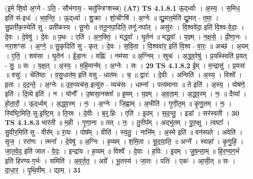 \documentclass[17pt]{extarticle}
\begin{document}
                  \newline
                      (इ॒मे शि॒वो अ॒ग्ने - ऽति॒ - सौभ॑गाय॒ - चतु॑स्त्रिꣳशच्च)  \textbf{(A7)} \newline \newline
                                \textbf{ TS 4.1.8.1} \newline
                  ऊ॒द्‌र्ध्वाः । अ॒स्य॒ । स॒मिध॒ इति॑ सं-इधः॑ । भ॒व॒न्ति॒ । ऊ॒द्‌र्ध्वा । शु॒क्रा । शो॒चीꣳषि॑ । अ॒ग्नेः ॥ द्यु॒मत्त॒मेति॑ द्यु॒मत् - त॒मा॒ । सु॒प्रती॑क॒स्येति॑ सु - प्रती॑कस्य । सू॒नोः ॥ तनू॒नपा॒दिति॒ तनू᳚-नपा᳚त् । असु॑रः । वि॒श्ववे॑दा॒ इति॑ वि॒श्व-वे॒दाः॒ । दे॒वः । दे॒वेषु॑ । दे॒वः ॥ प॒थः । एति॑ । अ॒न॒क्ति॒ । मद्ध्वा᳚ । घृ॒तेन॑ ॥ मद्ध्वा᳚ । य॒ज्ञ्म् । न॒क्ष॒से॒ । प्री॒णा॒नः । नरा॒शꣳसः॑ । अ॒ग्ने॒ ॥ सु॒कृदिति॑ सु - कृत् । दे॒वः । स॒वि॒ता । वि॒श्ववा॑र॒ इति॑ वि॒श्व - वा॒रः॒ ॥ अच्छ॑ । अ॒यम् । ए॒ति॒ । शव॑सा । घृ॒तेन॑ । ई॒डा॒नः । वह्निः॑ । नम॑सा ॥ अ॒ग्निम् । स्रुचः॑ । अ॒द्ध्व॒रेषु॑ । प्र॒यथ्स्विति॑ प्र॒यत् - सु॒ ॥ सः । य॒क्ष॒त् । अ॒स्य॒ । म॒हि॒मान᳚म् । अ॒ग्नेः । सः । \textbf{  29 } \newline
                  \newline
                                \textbf{ TS 4.1.8.2} \newline
                  ई॒म् । म॒न्द्रासु॑ । प्र॒यसः॑ ॥ वसुः॑ । चेति॑ष्ठः । व॒सु॒धात॑म॒ इति॑ वसु - धात॑मः । च॒ ॥ द्वारः॑ । दे॒वीः । अन्विति॑ । अ॒स्य॒ । विश्वे᳚ । व्र॒ता । द॒द॒न्ते॒ । अ॒ग्नेः ॥ उ॒रु॒व्यच॑स॒ इत्यु॑रु - व्यच॑सः । धाम्ना᳚ । पत्य॑मानाः ॥ ते इति॑ । अ॒स्य॒ । योष॑णे॒ इति॑ । दि॒व्ये इति॑ । न । योनौ᳚ । उ॒षासा॒नक्ता᳚ ॥ इ॒मम् । य॒ज्ञ्म् । अ॒व॒ता॒म् । अ॒द्ध्व॒रम् । नः॒ ॥ दैव्या᳚ । हो॒ता॒रौ॒ । ऊ॒द्‌र्ध्वम् । अ॒द्ध्व॒रम् । नः॒ । अ॒ग्नेः । जि॒ह्वाम् । अ॒भीति॑ । गृ॒णी॒त॒म् ॥ कृ॒णु॒तम् । नः॒ । स्वि॑ष्टि॒मिति॒ सु-इ॒ष्टि॒म् ॥ ति॒स्रः । दे॒वीः । ब॒र्॒.हिः । एति॑ । इ॒दम् । स॒द॒न्तु॒ । इडा᳚ । सर॑स्वती । \textbf{  30} \newline
                  \newline
                                \textbf{ TS 4.1.8.3} \newline
                  भार॑ती ॥ म॒ही । गृ॒णा॒ना ॥ तत् । नः॒ । तु॒रीप᳚म् । अद्भु॑तम् । पु॒रु॒क्षु । त्वष्टा᳚ । सु॒वीर॒मिति॑ सु - वीर᳚म् ॥ रा॒यः । पोष᳚म् । वीति॑ । स्य॒तु॒ । नाभि᳚म् । अ॒स्मे इति॑ ॥ वन॑स्पते । अवेति॑ । सृ॒ज॒ । ररा॑णः । त्मना᳚ । दे॒वेषु॑ ॥ अ॒ग्निः । ह॒व्यम् । श॒मि॒ता । सू॒द॒या॒ति॒ ॥ अग्ने᳚ । स्वाहा᳚ । कृ॒णु॒हि॒ । जा॒त॒वे॒द॒ इति॑ जात - वे॒दः॒ । इन्द्रा॑य । ह॒व्यम् ॥ विश्वे᳚ । दे॒वाः । ह॒विः । इ॒दम् । जु॒ष॒न्ता॒म् ॥ हि॒र॒ण्य॒ग॒र्भ इति॑ हिरण्य-ग॒र्भः । समिति॑ । अ॒व॒र्त॒त॒ । अग्रे᳚ । भू॒तस्य॑ । जा॒तः । पतिः॑ । एकः॑ । आ॒सी॒त् ॥ सः । दा॒धा॒र॒ । पृ॒थि॒वीम् । द्याम् । \textbf{  31} \newline
\end{document}
